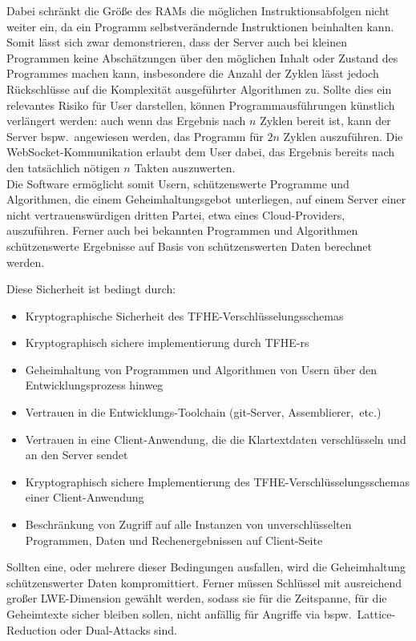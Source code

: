 Dabei schränkt die Größe des RAMs die möglichen Instruktionsabfolgen nicht weiter ein, da ein Programm selbstverändernde Instruktionen beinhalten kann.\\
Somit lässt sich zwar demonstrieren, dass der Server auch bei kleinen Programmen keine Abschätzungen über den möglichen Inhalt oder Zustand des Programmes machen kann,
insbesondere die Anzahl der Zyklen lässt jedoch Rückschlüsse auf die Komplexität ausgeführter Algorithmen zu.
Sollte dies ein relevantes Risiko für User darstellen, können Programmausführungen künstlich verlängert werden:
auch wenn das Ergebnis nach $n$ Zyklen bereit ist, kann der Server bspw.\ angewiesen werden, das Programm für $2n$ Zyklen auszuführen.
Die WebSocket-Kommunikation erlaubt dem User dabei, das Ergebnis bereits nach den tatsächlich nötigen $n$ Takten auszuwerten.\\

Die Software ermöglicht somit Usern, schützenswerte Programme und Algorithmen,
die einem Geheimhaltungsgebot unterliegen,
auf einem Server einer nicht vertrauenswürdigen dritten Partei, etwa eines Cloud-Providers, auszuführen.
Ferner auch bei bekannten Programmen und Algorithmen schützenswerte Ergebnisse auf Basis von schützenswerten Daten
berechnet werden.

Diese Sicherheit ist bedingt durch:
\begin{itemize}
    \item Kryptographische Sicherheit des TFHE-Verschlüsselungsschemas
    \item Kryptographisch sichere implementierung durch TFHE-rs
    \item Geheimhaltung von Programmen und Algorithmen von Usern über den Entwicklungsprozess hinweg
    \item Vertrauen in die Entwicklungs-Toolchain (git-Server, Assemblierer,\ etc.)
    \item Vertrauen in eine Client-Anwendung, die die Klartextdaten verschlüsseln und an den Server sendet
    \item Kryptographisch sichere Implementierung des TFHE-Verschlüsselungsschemas einer Client-Anwendung
    \item Beschränkung von Zugriff auf alle Instanzen von unverschlüsselten Programmen, Daten und Rechenergebnissen auf Client-Seite
\end{itemize}

Sollten eine, oder mehrere dieser Bedingungen ausfallen, wird die Geheimhaltung schützenswerter Daten kompromittiert.
Ferner müssen Schlüssel mit ausreichend großer LWE-Dimension gewählt werden, sodass sie für die Zeitspanne,
für die Geheimtexte sicher bleiben sollen, nicht anfällig für Angriffe via bspw.\ Lattice-Reduction oder Dual-Attacks sind.\\


